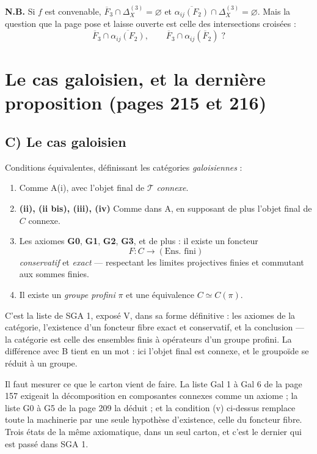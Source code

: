 \documentclass[11pt,a4paper]{article}
\begin{document}
\textbf{N.B.} Si $f$ est convenable, $\overline{F}_{3} \cap
\Delta_{X}^{(3)} = \varnothing$ et
$\overline{\alpha_{ij}(F_{2})} \cap \Delta_{X}^{(3)} = \varnothing$. Mais la
question que la page pose et laisse ouverte est celle des intersections
croisées :
\[
  \overline{F}_{3} \cap \overline{\alpha_{ij}(F_{2})} ,
  \qquad
  \overline{F}_{3} \cap \alpha_{ij}(\overline{F}_{2}) \;?
\]

\section*{Le cas galoisien, et la dernière proposition (pages 215 et 216)}

\subsection*{C) Le cas galoisien}

Conditions équivalentes, définissant les catégories \emph{galoisiennes} :

\begin{enumerate}
  \item[(i)] Comme A(i), avec l'objet final de $\mathcal{T}$ \emph{connexe}.
  \item[] \textbf{(ii), (ii bis), (iii), (iv)} Comme dans A, en supposant de
    plus l'objet final de $C$ connexe.
  \item[(v)] Les axiomes \textbf{G0}, \textbf{G1}, \textbf{G2}, \textbf{G3},
    et de plus : il existe un foncteur
    \[
      F : C \longrightarrow (\text{Ens.\ fini})
    \]
    \emph{conservatif} et \emph{exact} --- respectant les limites projectives
    finies et commutant aux sommes finies.
  \item[(vi)] Il existe un \emph{groupe profini} $\pi$ et une équivalence
    $C \simeq C(\pi)$.
\end{enumerate}

C'est la liste de SGA 1, exposé V, dans sa forme définitive : les axiomes de la
catégorie, l'existence d'un foncteur fibre exact et conservatif, et la
conclusion --- la catégorie est celle des ensembles finis à opérateurs d'un
groupe profini. La différence avec B tient en un mot : ici l'objet final est
connexe, et le groupoïde se réduit à un groupe.

Il faut mesurer ce que le carton vient de faire. La liste Gal 1 à Gal 6 de la
page 157 exigeait la décomposition en composantes connexes comme un axiome ;
la liste G0 à G5 de la page 209 la déduit ; et la condition (v) ci-dessus
remplace toute la machinerie par une seule hypothèse d'existence, celle du
foncteur fibre. Trois états de la même axiomatique, dans un seul carton, et
c'est le dernier qui est passé dans SGA 1.
\end{document}
